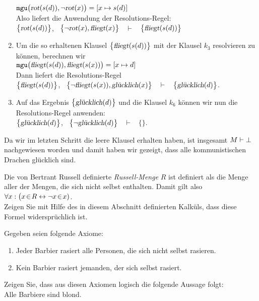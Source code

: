 \begin{enumerate}
      $\mathtt{mgu}\bigl(\textsl{rot}(s(d)), \neg \textsl{rot}(x)\bigr) = [x \mapsto s(d)]$
      \\[0.2cm]
      Also liefert die Anwendung der Resolutions-Regel:
      \\[0.2cm]
      \hspace*{1.3cm}
      $\bigl\{\textsl{rot}(s(d))\bigl\}$, \ $\bigl\{\neg \textsl{rot}(x), \textsl{fliegt}(x)\bigl\}$ \ $\vdash$ \ $\bigl\{\textsl{fliegt}(s(d))\bigl\}$
\item Um die so erhaltenen Klausel $\bigl\{\textsl{fliegt}(s(d))\bigl\}$ mit der Klausel
      $k_3$ resolvieren zu können, berechnen wir
      \\[0.2cm]
      \hspace*{1.3cm}
      $\mathtt{mgu}\bigl(\textsl{fliegt}(s(d)), \textsl{fliegt}(s(x))\bigr) = [x \mapsto d]$
      \\[0.2cm]
      Dann liefert die Resolutions-Regel
      \\[0.2cm]
      \hspace*{1.3cm}
      $\bigl\{\textsl{fliegt}(s(d))\bigl\}$, \ $\bigl\{\neg \textsl{fliegt}(s(x)), \textsl{glücklich}(x)\bigl\}$ \ $\vdash$ \ $\bigl\{\textsl{glücklich}(d)\bigl\}$.
\item Auf das Ergebnis $\bigl\{\textsl{glücklich}(d)\bigl\}$ und die Klausel $k_6$ können
      wir nun die Resolutions-Regel anwenden:
      \\[0.2cm]
      \hspace*{1.3cm}
      $\bigl\{\textsl{glücklich}(d)\bigl\}$, \  $\bigl\{\neg \textsl{glücklich}(d)\bigl\}$ \ $\vdash$ \ $\bigl\{\bigl\}$.
\end{enumerate}
Da wir im letzten Schritt die leere Klausel erhalten haben,  ist insgesamt $M \vdash
\bot$ 
nachgewiesen worden und damit haben wir gezeigt, dass alle kommunistischen Drachen glücklich sind. 
\eox

\exercise
Die von Bertrant Russell definierte \emph{Russell-Menge} $R$ ist
definiert als die Menge aller der Mengen, die sich nicht selbst enthalten.   Damit gilt also
\\[0.2cm]
\hspace*{1.3cm}
$\forall x: \bigl( x \!\in\! R \leftrightarrow \neg x \!\in\! x)$.
\\[0.2cm]
Zeigen Sie mit Hilfe des in diesem Abschnitt definierten Kalküls, dass diese Formel
widersprüchlich ist. 
\vspace{0.3cm}

\exercise
Gegeben seien folgende Axiome:
\begin{enumerate}
\item Jeder Barbier rasiert alle Personen, die sich nicht selbst rasieren.
\item Kein Barbier rasiert jemanden, der sich selbst rasiert.
\end{enumerate}
Zeigen Sie, dass aus diesen Axiomen logisch die folgende Aussage folgt: \\[0.3cm]
\hspace*{1.3cm} Alle Barbiere sind blond.

